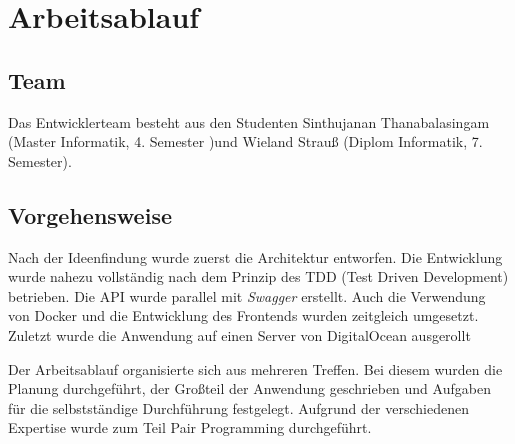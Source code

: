 

\section{Arbeitsablauf}

\subsection{Team}

Das Entwicklerteam besteht aus den Studenten Sinthujanan Thanabalasingam  (Master Informatik, 4. Semester )und Wieland Strauß (Diplom Informatik, 7. Semester). 


\subsection{Vorgehensweise}

Nach der Ideenfindung wurde zuerst die Architektur entworfen. 
Die Entwicklung wurde nahezu vollständig nach dem Prinzip des TDD (Test Driven Development) betrieben. 
Die API wurde parallel mit \textit{Swagger} erstellt. 
Auch die Verwendung von Docker und die Entwicklung des Frontends wurden zeitgleich umgesetzt.
 Zuletzt wurde die Anwendung auf einen Server von DigitalOcean ausgerollt

Der Arbeitsablauf organisierte sich aus mehreren Treffen. Bei diesem wurden die Planung durchgeführt, der Großteil der Anwendung geschrieben und Aufgaben für die selbstständige Durchführung festgelegt. Aufgrund der verschiedenen Expertise wurde zum Teil Pair Programming durchgeführt. 

